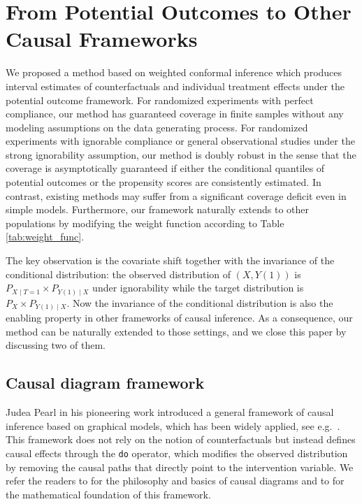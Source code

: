 \section{From Potential Outcomes to Other Causal Frameworks}\label{sec:extension}
We proposed a method based on weighted conformal inference which
produces interval estimates of counterfactuals and individual
treatment effects under the potential outcome framework. For
randomized experiments with perfect compliance, our method has
guaranteed coverage in finite samples without any modeling assumptions
on the data generating process. For randomized experiments with
ignorable compliance or general observational studies under the strong
ignorability assumption, our method is doubly robust in the sense that
the coverage is asymptotically guaranteed if either the conditional
quantiles of potential outcomes or the propensity scores are
consistently estimated. In contrast, existing methods may suffer from
a significant coverage deficit even in simple models. Furthermore, our
framework naturally extends to other populations by modifying the
weight function according to Table \ref{tab:weight_func}.

The key observation is the covariate shift together with the
invariance of the conditional distribution: the observed distribution
of $(X, Y(1))$ is $P_{X\mid T = 1}\times P_{Y(1)\mid X}$ under
ignorability while the target distribution is
$P_{X}\times P_{Y(1)\mid X}$. Now the invariance of the conditional distribution is
also the enabling property in other frameworks of causal inference. As
a consequence, our method can be naturally extended to those settings,
and we close this paper by discussing two of them.

\subsection{Causal diagram framework}
Judea Pearl in his pioneering work \citep{pearl1995causal} introduced
a general framework of causal inference based on graphical models,
which has been widely applied, see
  e.g.~\cite{greenland1999causal, spirtes2000causation,
    richardson2013single, glymour2014discovering,
    tennant2019use}. This framework does not rely on the notion of
counterfactuals but instead defines causal effects through the
\texttt{do} operator, which modifies the observed distribution by
removing the causal paths that directly point to the intervention
variable. We refer the readers to \cite{pearl2018book} for the
philosophy and basics of causal diagrams and to \cite{pearl2016causal}
for the mathematical foundation of this framework.

